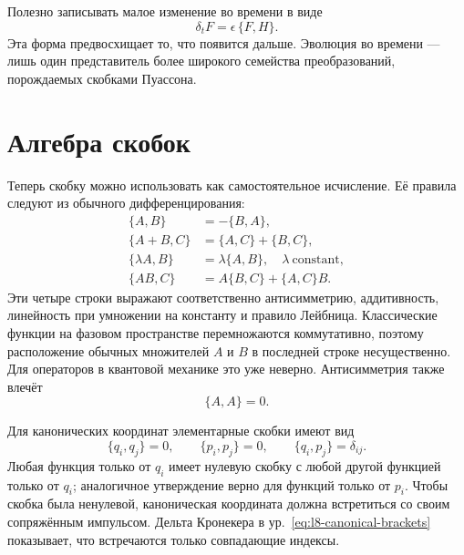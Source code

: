 \begin{classroomqa}
\end{classroomqa}

Полезно записывать малое изменение во времени в виде
\begin{equation}
  \delta_t F=\epsilon\,\{F,H\}.
  \label{eq:l8-small-time-step}
\end{equation}
Эта форма предвосхищает то, что появится дальше. Эволюция во времени — лишь один представитель более широкого семейства преобразований, порождаемых скобками Пуассона.

\section{Алгебра скобок}

Теперь скобку можно использовать как самостоятельное исчисление. Её правила следуют из обычного дифференцирования:
\begin{align}
  \{A,B\}&=-\{B,A\}, \label{eq:l8-antisymmetry}\\
  \{A+B,C\}&=\{A,C\}+\{B,C\}, \label{eq:l8-additivity}\\
  \{\lambda A,B\}&=\lambda\{A,B\},
    \quad \lambda\ \text{constant}, \label{eq:l8-scalar-rule}\\
  \{AB,C\}&=A\{B,C\}+\{A,C\}B. \label{eq:l8-leibniz}
\end{align}
Эти четыре строки выражают соответственно антисимметрию, аддитивность, линейность при умножении на константу и правило Лейбница.
Классические функции на фазовом пространстве перемножаются коммутативно, поэтому расположение обычных множителей \(A\) и \(B\) в последней строке несущественно. Для операторов в квантовой механике это уже неверно. Антисимметрия также влечёт
\begin{equation}
  \{A,A\}=0.
  \label{eq:l8-self-bracket}
\end{equation}

Для канонических координат элементарные скобки имеют вид
\begin{equation}
  \boxed{
  \{q_i,q_j\}=0,\qquad
  \{p_i,p_j\}=0,\qquad
  \{q_i,p_j\}=\delta_{ij}.}
  \label{eq:l8-canonical-brackets}
\end{equation}
Любая функция только от \(q_i\) имеет нулевую скобку с любой другой функцией только от \(q_i\); аналогичное утверждение верно для функций только от \(p_i\). Чтобы скобка была ненулевой, каноническая координата должна встретиться со своим сопряжённым импульсом. Дельта Кронекера в ур.~\eqref{eq:l8-canonical-brackets} показывает, что встречаются только совпадающие индексы.

